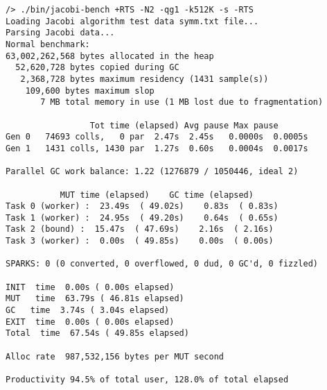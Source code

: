 \documentclass{tmr}
\begin{document}
\begin{lstlisting}[float,captionpos=b,belowcaptionskip=4pt, caption=Haskell test run 4]
/> ./bin/jacobi-bench +RTS -N2 -qg1 -k512K -s -RTS
Loading Jacobi algorithm test data symm.txt file...
Parsing Jacobi data...
Normal benchmark:
63,002,262,568 bytes allocated in the heap
  52,620,728 bytes copied during GC
   2,368,728 bytes maximum residency (1431 sample(s))
    109,600 bytes maximum slop
       7 MB total memory in use (1 MB lost due to fragmentation)

                 Tot time (elapsed) Avg pause Max pause
Gen 0   74693 colls,   0 par  2.47s  2.45s   0.0000s  0.0005s
Gen 1   1431 colls, 1430 par  1.27s  0.60s   0.0004s  0.0017s

Parallel GC work balance: 1.22 (1276879 / 1050446, ideal 2)

           MUT time (elapsed)    GC time (elapsed)
Task 0 (worker) :  23.49s  ( 49.02s)    0.83s  ( 0.83s)
Task 1 (worker) :  24.95s  ( 49.20s)    0.64s  ( 0.65s)
Task 2 (bound) :  15.47s  ( 47.69s)    2.16s  ( 2.16s)
Task 3 (worker) :  0.00s  ( 49.85s)    0.00s  ( 0.00s)

SPARKS: 0 (0 converted, 0 overflowed, 0 dud, 0 GC'd, 0 fizzled)

INIT  time  0.00s ( 0.00s elapsed)
MUT   time  63.79s ( 46.81s elapsed)
GC   time  3.74s ( 3.04s elapsed)
EXIT  time  0.00s ( 0.00s elapsed)
Total  time  67.54s ( 49.85s elapsed)

Alloc rate  987,532,156 bytes per MUT second

Productivity 94.5% of total user, 128.0% of total elapsed

\end{lstlisting}
\end{document}
